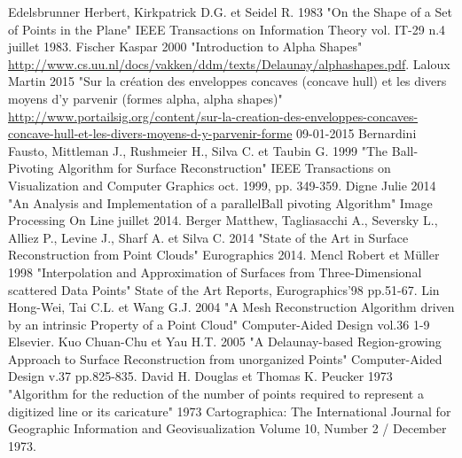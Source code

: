 \documentclass[a4paper,10pt]{report}
\begin{document}
\begin{thebibliography}{1}
 Edelsbrunner Herbert, Kirkpatrick D.G. et Seidel R. 1983 "On the Shape of a Set of Points in the Plane" IEEE Transactions on Information Theory vol. IT-29 n.4 juillet 1983.
 Fischer Kaspar 2000 "Introduction to Alpha Shapes" \url{http://www.cs.uu.nl/docs/vakken/ddm/texts/Delaunay/alphashapes.pdf}.
 Laloux Martin 2015 "Sur la création des enveloppes concaves (concave hull) et les divers moyens d'y parvenir (formes alpha, alpha shapes)" \url{http://www.portailsig.org/content/sur-la-creation-des-enveloppes-concaves-concave-hull-et-les-divers-moyens-d-y-parvenir-forme} 09-01-2015
 Bernardini Fausto, Mittleman J., Rushmeier H., Silva C. et Taubin G. 1999 "The Ball-Pivoting Algorithm for Surface Reconstruction" IEEE Transactions on Visualization and Computer Graphics oct. 1999, pp. 349-359.
 Digne Julie 2014 "An Analysis and Implementation of a parallelBall pivoting Algorithm" Image Processing On Line juillet 2014.
 Berger Matthew, Tagliasacchi A., Seversky L., Alliez P., Levine J., Sharf A. et Silva C. 2014 "State of the Art in Surface Reconstruction from Point Clouds" Eurographics 2014.
 Mencl Robert et M{\"u}ller 1998 "Interpolation and Approximation of Surfaces from Three-Dimensional scattered Data Points" State of the Art Reports, Eurographics'98 pp.51-67.
 Lin Hong-Wei, Tai C.L. et Wang G.J. 2004 "A Mesh Reconstruction Algorithm driven by an intrinsic Property of a Point Cloud" Computer-Aided Design vol.36 1-9 Elsevier.
 Kuo Chuan-Chu et Yau H.T. 2005 "A Delaunay-based Region-growing Approach to Surface Reconstruction from unorganized Points" Computer-Aided Design v.37 pp.825-835.
 David H. Douglas et Thomas K. Peucker 1973 "Algorithm for the reduction of the number of points required to represent a digitized line or its caricature" 1973 Cartographica: The International Journal for Geographic Information and Geovisualization Volume 10, Number 2 / December 1973.


\end{thebibliography}
\end{document}
